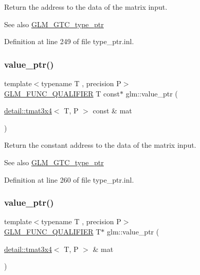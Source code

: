 Return the address to the data of the matrix input. \begin{DoxySeeAlso}{See also}
\hyperlink{group__gtc__type__ptr}{G\+L\+M\+\_\+\+G\+T\+C\+\_\+type\+\_\+ptr} 
\end{DoxySeeAlso}


Definition at line 249 of file type\+\_\+ptr.\+inl.

\mbox{\label{group__gtc__type__ptr_ga233effe326542ae9657b8feac80e541f}} 
\subsubsection{\texorpdfstring{value\+\_\+ptr()}{value\_ptr()}\hspace{0.1cm}{\footnotesize\ttfamily [22/27]}}
{\footnotesize\ttfamily template$<$typename T , precision P$>$ \\
\hyperlink{setup_8hpp_a33fdea6f91c5f834105f7415e2a64407}{G\+L\+M\+\_\+\+F\+U\+N\+C\+\_\+\+Q\+U\+A\+L\+I\+F\+I\+ER} T const$\ast$ glm\+::value\+\_\+ptr (\begin{DoxyParamCaption}\item[{\hyperlink{structglm_1_1detail_1_1tmat3x4}{detail\+::tmat3x4}$<$ T, P $>$ const \&}]{mat }\end{DoxyParamCaption})}

Return the constant address to the data of the matrix input. \begin{DoxySeeAlso}{See also}
\hyperlink{group__gtc__type__ptr}{G\+L\+M\+\_\+\+G\+T\+C\+\_\+type\+\_\+ptr} 
\end{DoxySeeAlso}


Definition at line 260 of file type\+\_\+ptr.\+inl.

\mbox{\label{group__gtc__type__ptr_gad8c6b1dbda2b48d19fd1bc8b01cf701c}} 
\subsubsection{\texorpdfstring{value\+\_\+ptr()}{value\_ptr()}\hspace{0.1cm}{\footnotesize\ttfamily [23/27]}}
{\footnotesize\ttfamily template$<$typename T , precision P$>$ \\
\hyperlink{setup_8hpp_a33fdea6f91c5f834105f7415e2a64407}{G\+L\+M\+\_\+\+F\+U\+N\+C\+\_\+\+Q\+U\+A\+L\+I\+F\+I\+ER} T$\ast$ glm\+::value\+\_\+ptr (\begin{DoxyParamCaption}\item[{\hyperlink{structglm_1_1detail_1_1tmat3x4}{detail\+::tmat3x4}$<$ T, P $>$ \&}]{mat }\end{DoxyParamCaption})}

